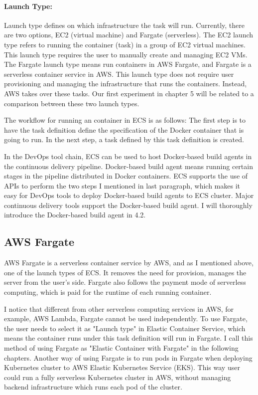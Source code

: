 \paragraph{Launch Type:} Launch type defines on which infrastructure the task will run. Currently, there are two options, EC2 (virtual machine) and Fargate (serverless). The EC2 launch type refers to running the container (task) in a group of EC2 virtual machines. This launch type requires the user to manually create and managing EC2 VMs. The Fargate launch type means run containers in AWS Fargate, and Fargate is a serverless container service in AWS. This launch type does not require user provisioning and managing the infrastructure that runs the containers. Instead, AWS takes over these tasks. Our first experiment in chapter 5 will be related to a comparison between these two launch types.
\par
The workflow for running an container in ECS is as follows:
The first step is to have the task definition define the specification of the Docker container that is going to run. In the next step, a task defined by this task definition is created.
\par
In the DevOps tool chain, ECS can be used to host Docker-based build agents in the continuous delivery pipeline. Docker-based build agent means running certain stages in the pipeline distributed in Docker containers. 
ECS supports the use of APIs to perform the two steps I mentioned in last paragraph, which makes it easy for DevOps tools to deploy Docker-based build agents to ECS cluster.
Major continuous delivery tools support the Docker-based build agent. 
I will thoroughly introduce the Docker-based build agent in 4.2.
\subsection{AWS Fargate}
AWS Fargate is a serverless container service by AWS, and as I mentioned above, one of the launch types of ECS. It removes the need for provision, manages the server from the user's side. Fargate also follows the payment mode of serverless computing, which is paid for the runtime of each running container. 
\par
I notice that different from other serverless computing services in AWS, for example, AWS Lambda, Fargate cannot be used independently. To use Fargate, the user needs to select it as "Launch type" in Elastic Container Service, which means the container runs under this task definition will run in Fargate.  I call this method of using Fargate as "Elastic Container with Fargate" in the following chapters. Another way of using Fargate is to run pods in Fargate when deploying Kubernetes cluster to AWS Elastic Kubernetes Service (EKS). This way user could run a fully serverless Kubernetes cluster in AWS, without managing backend infrastructure which runs each pod of the cluster.

